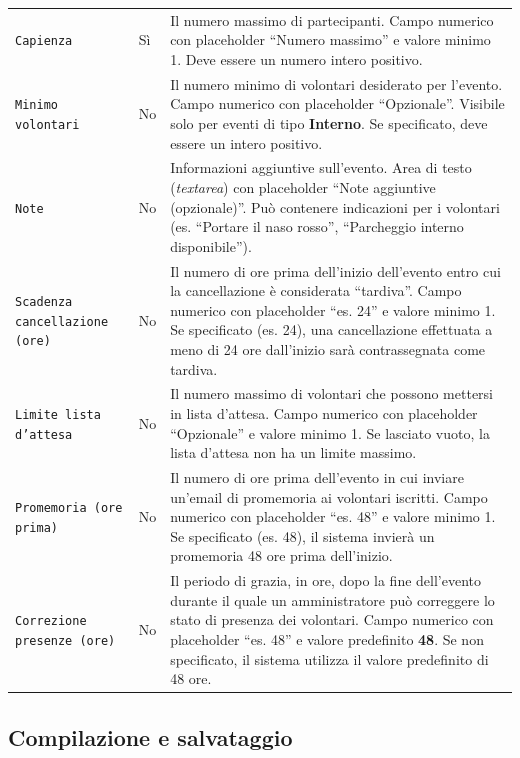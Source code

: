 \documentclass[a4paper,11pt,oneside]{book}
\newcommand{\campo}[1]{\texttt{#1}}
\begin{document}
\begin{longtable}{l l p{7.5cm}}
\campo{Capienza} & S\`i & Il numero massimo di partecipanti. Campo numerico con placeholder ``Numero massimo'' e valore minimo 1. Deve essere un numero intero positivo. \\[6pt]

\campo{Minimo volontari} & No & Il numero minimo di volontari desiderato per l'evento. Campo numerico con placeholder ``Opzionale''. Visibile solo per eventi di tipo \textbf{Interno}. Se specificato, deve essere un intero positivo. \\[6pt]

\campo{Note} & No & Informazioni aggiuntive sull'evento. Area di testo (\textit{textarea}) con placeholder ``Note aggiuntive (opzionale)''. Pu\`o contenere indicazioni per i volontari (es. ``Portare il naso rosso'', ``Parcheggio interno disponibile''). \\[6pt]

\campo{Scadenza cancellazione (ore)} & No & Il numero di ore prima dell'inizio dell'evento entro cui la cancellazione \`e considerata ``tardiva''. Campo numerico con placeholder ``es. 24'' e valore minimo 1. Se specificato (es. 24), una cancellazione effettuata a meno di 24 ore dall'inizio sar\`a contrassegnata come tardiva. \\[6pt]

\campo{Limite lista d'attesa} & No & Il numero massimo di volontari che possono mettersi in lista d'attesa. Campo numerico con placeholder ``Opzionale'' e valore minimo 1. Se lasciato vuoto, la lista d'attesa non ha un limite massimo. \\[6pt]

\campo{Promemoria (ore prima)} & No & Il numero di ore prima dell'evento in cui inviare un'email di promemoria ai volontari iscritti. Campo numerico con placeholder ``es. 48'' e valore minimo 1. Se specificato (es. 48), il sistema invier\`a un promemoria 48 ore prima dell'inizio. \\[6pt]

\campo{Correzione presenze (ore)} & No & Il periodo di grazia, in ore, dopo la fine dell'evento durante il quale un amministratore pu\`o correggere lo stato di presenza dei volontari. Campo numerico con placeholder ``es. 48'' e valore predefinito \textbf{48}. Se non specificato, il sistema utilizza il valore predefinito di 48 ore. \\
\bottomrule
\end{longtable}

\subsection{Compilazione e salvataggio}
\end{document}
